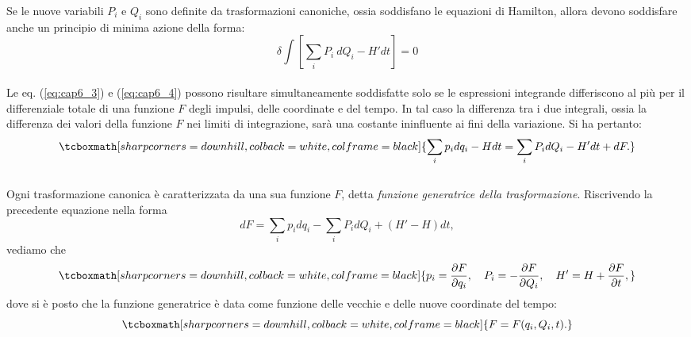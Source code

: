 \documentclass[a4paper,12pt,oneside]{book}
\begin{document}
Se le nuove variabili $P_i$ e $Q_i$ sono definite da trasformazioni canoniche, ossia soddisfano le equazioni di Hamilton, allora devono soddisfare anche un principio di minima azione della forma:
	\begin{equation}
		\delta \int \left[ \sum_i P_i\ dQ_i - H'dt\right] = 0
		\label{eq:cap6_4}
	\end{equation}\\
	
Le eq. (\ref{eq:cap6_3}) e (\ref{eq:cap6_4}) possono risultare simultaneamente soddisfatte solo se le espressioni integrande differiscono al pi\`u per il differenziale totale di una funzione $F$ degli impulsi, delle coordinate e del tempo. In tal caso la differenza tra i due integrali, ossia la differenza dei valori della funzione $F$ nei limiti di integrazione, sar\`a una costante ininfluente ai fini della variazione. Si ha pertanto:
	\begin{equation}
		\tcboxmath[sharp corners=downhill, colback=white, colframe=black]{
			\sum_i p_i dq_i - Hdt = \sum_i P_i d Q_i - H'dt + dF .
			}
	\end{equation}\\
	
Ogni trasformazione canonica \`e caratterizzata da una sua funzione $F$, detta \textit{funzione generatrice della trasformazione}. Riscrivendo la precedente equazione nella forma
	\begin{equation}
		dF = \sum_i p_i d q_i - \sum_i P_i dQ_i + (H'-H)dt ,
		\label{eq:cap6_5}
	\end{equation}
vediamo che
	\begin{equation}
		\tcboxmath[sharp corners=downhill, colback=white, colframe=black]{
			p_i = \frac{\partial F}{\partial q_i} , \quad P_i = - \frac{\partial F}{\partial Q_i} , \quad H' = H + \frac{\partial F}{\partial t} ,
			}
		\label{o}
	\end{equation}
dove si \`e posto che la funzione generatrice \`e data come funzione delle vecchie e delle nuove coordinate del tempo:
	\begin{equation}
		\tcboxmath[sharp corners=downhill, colback=white, colframe=black]{
			F = F(q_i, Q_i,t) .
			}
	\end{equation}\\
	
\end{document}
